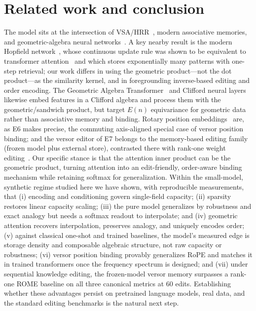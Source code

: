 \documentclass[10pt,twocolumn]{article}
\begin{document}
\section{Related work and conclusion}
The model sits at the intersection of VSA/HRR~\cite{plate1995,kanerva2009,kleyko2022},
modern associative memories, and
geometric-algebra neural networks~\cite{brandstetter2022,ruhe2023,brehmer2023}. A key
nearby result is the modern Hopfield network~\cite{ramsauer2020,hopfield1982}, whose
continuous update rule was shown to be equivalent to transformer
attention~\cite{vaswani2017} and which stores exponentially many patterns with
one-step retrieval; our work differs in using the geometric product---not the dot
product---as the similarity kernel, and in foregrounding inverse-based editing and
order encoding. The Geometric Algebra Transformer~\cite{brehmer2023} and Clifford
neural layers~\cite{brandstetter2022,ruhe2023} likewise embed features in a Clifford
algebra and process them with the geometric/sandwich product, but target $E(n)$
equivariance for geometric data rather than associative memory and binding.
Rotary position embeddings~\cite{su2021roformer} are, as E6 makes precise, the
commuting axis-aligned special case of versor position binding; and the versor
editor of E7 belongs to the memory-based editing family (frozen model plus
external store), contrasted there with rank-one weight editing~\cite{meng2022rome}.
Our specific stance is that the attention
inner product can be the geometric product, turning attention into an
edit-friendly, order-aware binding mechanism while retaining softmax for
generalization. Within the small-model, synthetic regime studied here we have
shown, with reproducible measurements, that (i) encoding and conditioning govern
single-field capacity; (ii) sparsity restores linear capacity scaling;
(iii) the pure model generalizes by robustness and exact analogy but needs a
softmax readout to interpolate; and (iv) geometric attention recovers
interpolation, preserves analogy, and uniquely encodes order; (v) against
classical one-shot and trained baselines, the model's measured edge is storage
density and composable algebraic structure, not raw capacity or robustness;
(vi) versor position binding provably generalizes RoPE and matches it in trained
transformers once the frequency spectrum is designed; and (vii) under sequential
knowledge editing, the frozen-model versor memory surpasses a rank-one ROME
baseline on all three canonical metrics at 60 edits. Establishing
whether these advantages persist on pretrained language models, real data, and
the standard editing benchmarks is the natural next step.
\end{document}
